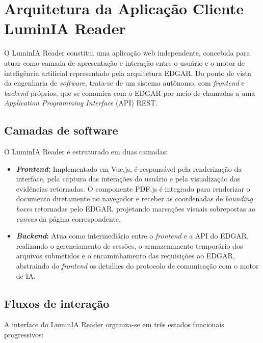 \chapter{Arquitetura da Aplicação Cliente LuminIA Reader}
\label{ap:luminia-reader}

O LuminIA Reader constitui uma aplicação web independente, concebida para atuar como camada de apresentação e interação entre o usuário e o motor de inteligência artificial representado pela arquitetura EDGAR. Do ponto de vista da engenharia de \textit{software}, trata-se de um sistema autônomo, com \textit{frontend} e \textit{backend} próprios, que se comunica com o EDGAR por meio de chamadas a uma \textit{Application Programming Interface} (API) REST.

\section{Camadas de software}
\label{sec:ap-luminia-camadas}

O LuminIA Reader é estruturado em duas camadas:
\begin{itemize}
\item \textbf{\textit{Frontend}:} Implementado em Vue.js, é responsável pela renderização da interface, pela captura das interações do usuário e pela visualização das evidências retornadas. O componente PDF.js é integrado para renderizar o documento diretamente no navegador e receber as coordenadas de \textit{bounding boxes} retornadas pelo EDGAR, projetando marcações visuais sobrepostas ao \textit{canvas} da página correspondente.

\item \textbf{\textit{Backend}:} Atua como intermediário entre o \textit{frontend} e a API do EDGAR, realizando o gerenciamento de sessões, o armazenamento temporário dos arquivos submetidos e o encaminhamento das requisições ao EDGAR, abstraindo do \textit{frontend} os detalhes do protocolo de comunicação com o motor de IA.

\end{itemize}

\section{Fluxos de interação}
\label{sec:ap-luminia-fluxos}

A interface do LuminIA Reader organiza-se em três estados funcionais progressivos:

